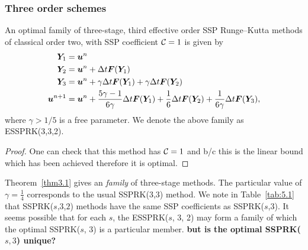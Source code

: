 \subsubsection{Three order schemes}\label{subsubsection3.4.1}




\begin{theorem}\label{thm3.1}
  An  optimal family of three-stage, third effective order
  SSP Runge--Kutta methods of classical order two, with SSP
  coefficient $\mathcal{C}=1$ is given by
    \begin{displaymath}
        \begin{split}
            \bm{Y}_{1} &= \bm{u}^{n} \\
            \bm{Y}_{2} &= \bm{u}^{n} + \Delta t\bm{F}(\bm{Y}_{1}) \\
            \bm{Y}_{3} &= \bm{u}^{n} + \gamma\Delta t\bm{F}(\bm{Y}_{1}) + \gamma\Delta t\bm{F}(\bm{Y}_{2}) \\
            \bm{u}^{n+1} &= \bm{u}^{n} + \frac{5\gamma-1}{6\gamma}\Delta t\bm{F}(\bm{Y}_{1}) + \frac{1}{6}\Delta t\bm{F}(\bm{Y}_{2}) + \frac{1}{6\gamma}\Delta t\bm{F}(\bm{Y}_{3}),
        \end{split}
    \end{displaymath}
    where \( \gamma > 1/5 \) is a free parameter. We denote the above family as ESSPRK(3,3,2).
\end{theorem}


\begin{proof}
One can check that this method has $\mathcal{C} = 1$ and b/c this is the linear bound which has been achieved therefore it is optimal.
\end{proof}


Theorem~\ref{thm3.1} gives an \emph{family} of three-stage methods.
The particular value of $\gamma = \frac{1}{4}$ corresponds to the
usual SSPRK(3,3) method.  We note in Table~\ref{tab:5.1} that
SSPRK(\( s \),\( 3 \),\( 2 \)) methods have the same SSP coefficients
as SSPRK(\( s \),\( 3 \)).  It seems possible that for each $s$, the
ESSPRK($s$, 3, 2) may form a family of which the optimal SSPRK($s$, 3)
is a particular member. {\bf but is the optimal SSPRK($s,3$) unique?}


